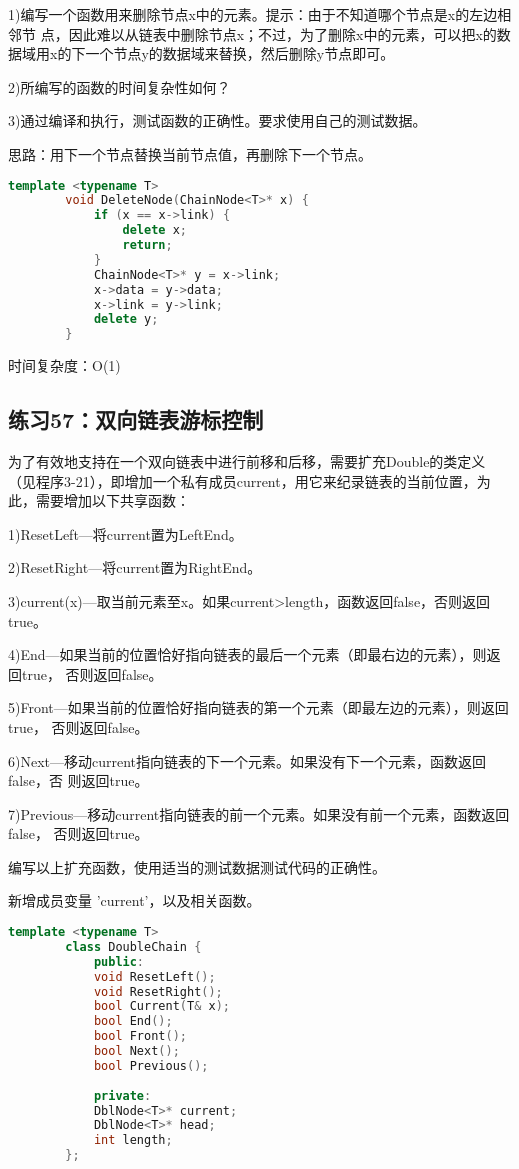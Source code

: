 \documentclass[UTF8]{ctexart}
\begin{document}
	1)编写一个函数用来删除节点x中的元素。提示：由于不知道哪个节点是x的左边相邻节
	点，因此难以从链表中删除节点x；不过，为了删除x中的元素，可以把x的数据域用x的下一个节点y的数据域来替换，然后删除y节点即可。
	
	2)所编写的函数的时间复杂性如何？
	
	3)通过编译和执行，测试函数的正确性。要求使用自己的测试数据。
	
	思路：用下一个节点替换当前节点值，再删除下一个节点。
	
	\begin{lstlisting}[language=C++]
		template <typename T>
		void DeleteNode(ChainNode<T>* x) {
			if (x == x->link) {
				delete x;
				return;
			}
			ChainNode<T>* y = x->link;
			x->data = y->data;
			x->link = y->link;
			delete y;
		}
	\end{lstlisting}
	
	 时间复杂度：O(1)
	
	
	
	\subsection*{练习57：双向链表游标控制}
	为了有效地支持在一个双向链表中进行前移和后移，需要扩充Double的类定义（见程序3-21），即增加一个私有成员current，用它来纪录链表的当前位置，为此，需要增加以下共享函数：
	
	1)ResetLeft—将current置为LeftEnd。
	
	2)ResetRight—将current置为RightEnd。
	
	3)current(x)—取当前元素至x。如果current>length，函数返回false，否则返回true。
	
	4)End—如果当前的位置恰好指向链表的最后一个元素（即最右边的元素），则返回true，
	否则返回false。
	
	5)Front—如果当前的位置恰好指向链表的第一个元素（即最左边的元素），则返回true，
	否则返回false。
	
	6)Next—移动current指向链表的下一个元素。如果没有下一个元素，函数返回false，否
	则返回true。
	
	7)Previous—移动current指向链表的前一个元素。如果没有前一个元素，函数返回false，
	否则返回true。
	
	编写以上扩充函数，使用适当的测试数据测试代码的正确性。
	
	新增成员变量 'current'，以及相关函数。
	
	\begin{lstlisting}[language=C++]
		template <typename T>
		class DoubleChain {
			public:
			void ResetLeft();
			void ResetRight();
			bool Current(T& x);
			bool End();
			bool Front();
			bool Next();
			bool Previous();
			
			private:
			DblNode<T>* current;
			DblNode<T>* head;
			int length;
		};
	\end{lstlisting}
	
\end{document}
